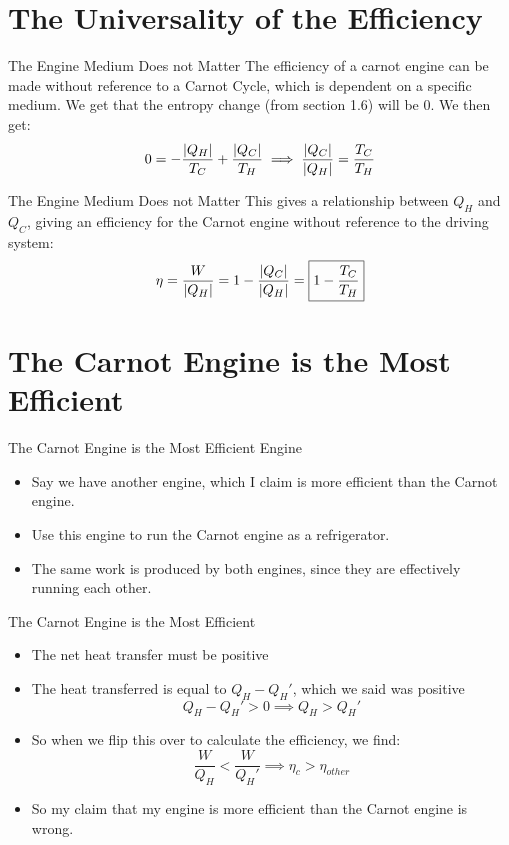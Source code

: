 \documentclass{beamer}
\begin{document}
\section{The Universality of the Efficiency}
\begin{frame}{The Engine Medium Does not Matter}
  The efficiency of a carnot engine can be made without reference to a Carnot Cycle, which is dependent on a specific medium. We get that the entropy change (from section 1.6) will be 0. We then get:
  \begin{equation}
    0=-\frac{\abs{Q_H}}{T_C}+\frac{\abs{Q_C}}{T_H}
    \implies\frac{\abs{Q_C}}{\abs{Q_H}}=\frac{T_C}{T_H}
  \end{equation}
\end{frame}

\begin{frame}{The Engine Medium Does not Matter}
  This gives a relationship between $Q_H$ and $Q_C$, giving an efficiency for the Carnot engine without reference to the driving system:
  \begin{equation}
    \eta=\frac{W}{\abs{Q_H}}=1-\frac{\abs{Q_C}}{\abs{Q_H}}
    =\boxed{1-\frac{T_C}{T_H}}
  \end{equation}
\end{frame}

\section{The Carnot Engine is the Most Efficient}
\begin{frame}{The Carnot Engine is the Most Efficient Engine}
  \begin{itemize}
  \item Say we have another engine, which I claim is more efficient than the Carnot engine.
  \item Use this engine to run the Carnot engine as a refrigerator.
  \item The same work is produced by both engines, since they are effectively running each other.
  \end{itemize}
\end{frame}

\begin{frame}{The Carnot Engine is the Most Efficient}
  \begin{itemize}
    \item The net heat transfer must be positive
  \item The heat transferred is equal to $Q_H-Q_H'$, which we said was positive
    \begin{equation}
      Q_H-Q_H'>0\implies Q_H>Q_H'
    \end{equation}
  \item So when we flip this over to calculate the efficiency, we find:
    \begin{equation}
      \frac{W}{Q_H}<\frac{W}{Q_H'}\implies \eta_{c}>\eta_{other}
    \end{equation}
  \item So my claim that my engine is more efficient than the Carnot engine is wrong.
  \end{itemize}
\end{frame}
\end{document}
